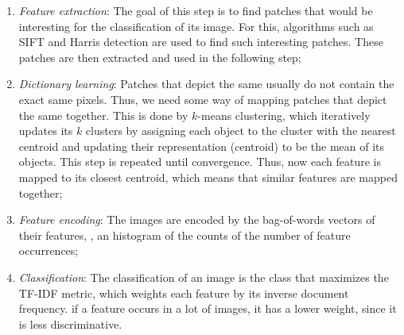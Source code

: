 
\begin{enumerate}
    \item \textit{Feature extraction}: The goal of this step is to find patches
          that would be interesting for the classification of its image. For this,
          algorithms such as SIFT and Harris detection are used to find such
          interesting patches. These patches are then extracted and used in the
          following step;
    \item \textit{Dictionary learning}: Patches that depict the same usually do
          not contain the exact same pixels. Thus, we need some way of mapping
          patches that depict the same together. This is done by $k$-means
          clustering, which iteratively updates its $k$ clusters by assigning each
          object to the cluster with the nearest centroid and updating their
          representation (centroid) to be the mean of its objects. This step is
          repeated until convergence. Thus, now each feature is mapped to its closest
          centroid, which means that similar features are mapped together;
    \item \textit{Feature encoding}: The images are encoded by the bag-of-words
          vectors of their features, \ie, an histogram of the counts of the number of
          feature occurrences;
    \item \textit{Classification}: The classification of an image is the class
          that maximizes the TF-IDF metric, which weights each feature by its
          inverse document frequency. \Ie if a feature occurs in a lot of images, it
          has a lower weight, since it is less discriminative.
\end{enumerate}
